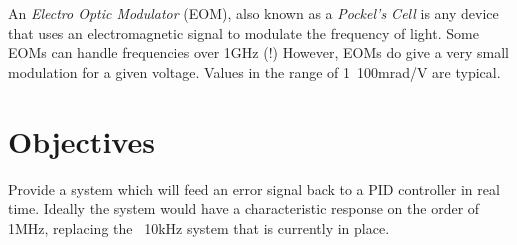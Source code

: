 An \emph{Electro Optic Modulator} (EOM), also known as a \emph{Pockel's Cell} is any device that uses an electromagnetic signal to modulate the frequency of light.  Some EOMs can handle frequencies over 1GHz (!)  However, EOMs do give a very small modulation for a given voltage.  Values in the range of 1~100mrad/V are typical.


\section{Objectives}

Provide a system which will feed an error signal back to a PID controller in real time.  Ideally the system would have a characteristic response on the order of 1MHz, replacing the ~10kHz system that is currently in place.

